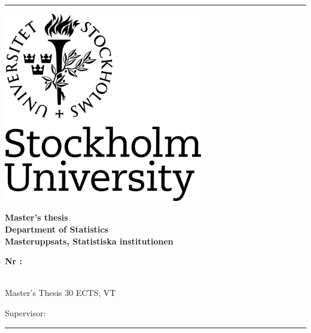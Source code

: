 \makeatletter
\begin{titlepage}
  \begin{center}
   	\rule{\textwidth}{2pt}
   	{\selectfont
   	
   	\begin{minipage}{0.35\textwidth}
   	  \vspace{0.2cm}
   	  \includegraphics[width=0.65\textwidth]{cover/su_logo}
   	\end{minipage}\begin{minipage}{0.65\textwidth}
   	  \begin{flushright}
   		{\fontsize{40}{50} \textbf{Master's thesis}}\\
   		\vspace{0.4cm}
   		{\huge \textbf{Department of Statistics}}\\
   		\vspace{0.4cm}   		
   		{\large \textbf{Masteruppsats, Statistiska institutionen}}
   	  \end{flushright}
   	\end{minipage}
   
      \vspace*{2cm}
      
      \begin{flushright}
        {\fontsize{18}{22}\textbf{Nr \thesisyear:\thesisnumber}}\\
        
        \vspace*{2cm}
        {\fontsize{24}{30}\textbf{\@title}}\\
        
        \vspace{0.8cm}
        {\fontsize{18}{22}\textbf{\@author}}
      \end{flushright}
       	       
      \vfill
      
      \begin{flushleft}
        {\Large Master's Thesis 30 ECTS, VT \thesisyear
        	
        Supervisor: \supervisor }
      \end{flushleft}
    }       
    \rule{\textwidth}{2pt}
  \end{center}
\end{titlepage}
\newpage \ \newpage
